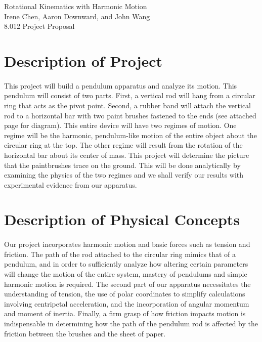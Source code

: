 \documentclass[12pt]{article}
\begin{document}
\begin{center}
\Huge Rotational Kinematics with Harmonic Motion \\
\vspace{0.1cm}
\hline
\vspace{0.1cm}
\large Irene Chen, Aaron Downward, and John Wang \\ 
\normalsize 8.012 Project Proposal\\

\end{center}

\section{Description of Project}

\paragraph{} This project will build a pendulum apparatus and analyze its motion. This pendulum will consist of two parts. First, a vertical rod will hang from a circular ring that acts as the pivot point. Second, a rubber band will attach the vertical rod to a horizontal bar with two paint brushes fastened to the ends (see attached page for diagram). This entire device will have two regimes of motion. One regime will be the harmonic, pendulum-like motion of the entire object about the circular ring at the top. The other regime will result from the rotation of the horizontal bar about its center of mass. This project will determine the picture that the paintbrushes trace on the ground. This will be done analytically by examining the physics of the two regimes and we shall verify our results with experimental evidence from our apparatus. 

\section{Description of Physical Concepts}

\paragraph{} Our project incorporates harmonic motion and basic forces such as tension and friction. The path of the rod attached to the circular ring mimics that of a pendulum, and in order to sufficiently analyze how altering certain parameters will change the motion of the entire system, mastery of pendulums and simple harmonic motion is required. The second part of our apparatus necessitates the understanding of tension, the use of polar coordinates to simplify calculations involving centripetal acceleration, and the incorporation of angular momentum and moment of inertia. Finally, a firm grasp of how friction impacts motion is indispensable in determining how the path of the pendulum rod is affected by the friction between the brushes and the sheet of paper.
\end{document}
